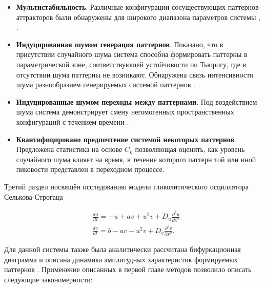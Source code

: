 \begin{itemize}
    \item \textbf{Мультистабильность}. Различные конфигурации сосуществующих паттернов-аттракторов были обнаружены для широкого диапазона параметров системы \cite{bib3}, \cite{bib4}.
    \item \textbf{Индуцированная шумом генерация паттернов}. Показано, что в присутствии случайного шума система способна формировать паттерны в параметрической зоне, соответствующей устойчивости по Тьюригу, где в отсутствии шума паттерны не возникают. Обнаружена связь интенсивности шума разнообразием генерируемых системой паттернов \cite{bib3}.
    \item \textbf{Индуцированные шумом переходы между паттернами}. Под воздействием шума система демонстрирует смену негомогенных пространственных конфигураций с течением времени \cite{bib4}.
    \item \textbf{Квантифицировано предпочтение системой некоторых паттернов}. Предложена статистика на основе $C_k$ позволяющая оценить, как уровень случайного шума влияет на время, в течение которого паттерн той или иной пиковости представлен в переходном процессе.
\end{itemize}

Третий раздел посвящён исследованию модели гликолитического осциллятора Селькова-Строгаца

\begin{equation}
    \begin{aligned}
        & \frac{d u}{d t}=-u+a v+u^2 v+D_u \frac{\partial^2 u}{\partial x^2} \\
        & \frac{d v}{d t}=b-a v-u^2 v+D_v \frac{\partial^2 v}{\partial x^2}.
        \end{aligned}
\end{equation}

Для данной системы также была аналитически рассчитана бифуркационная диаграмма и описана динамика амплитудных характеристик формируемых паттернов \cite{bib5}. Применение описанных в первой главе методов позволило описать следующие закономерности:


